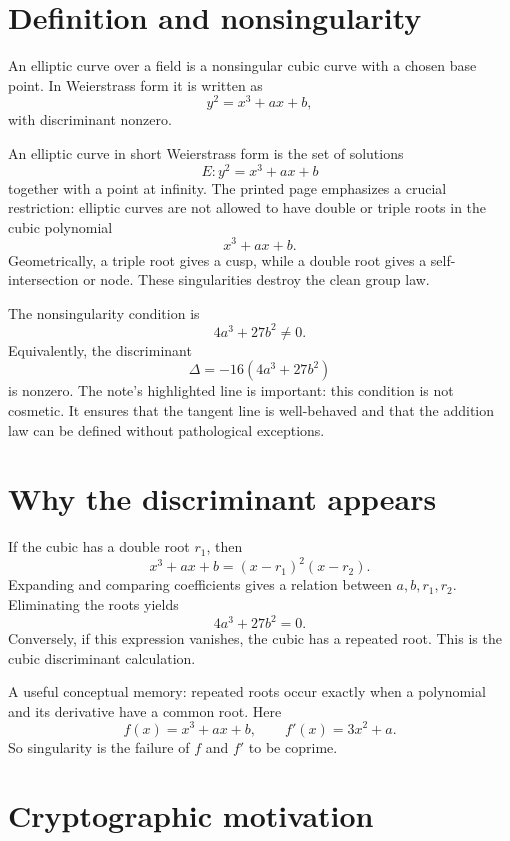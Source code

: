 
\section{Definition and nonsingularity}

\begin{definition}
An elliptic curve over a field is a nonsingular cubic curve with a chosen base point.  In Weierstrass form it is written as
\[
  y^2=x^3+ax+b,
\]
with discriminant nonzero.
\end{definition}


An elliptic curve in short Weierstrass form is the set of solutions
\[
  E:y^2=x^3+ax+b
\]
together with a point at infinity.  The printed page emphasizes a crucial restriction: elliptic curves are not allowed to have double or triple roots in the cubic polynomial
\[
  x^3+ax+b.
\]
Geometrically, a triple root gives a cusp, while a double root gives a self-intersection or node.  These singularities destroy the clean group law.

The nonsingularity condition is
\[
  4a^3+27b^2\neq0.
\]
Equivalently, the discriminant
\[
  \Delta=-16(4a^3+27b^2)
\]
is nonzero.  The note's highlighted line is important: this condition is not cosmetic.  It ensures that the tangent line is well-behaved and that the addition law can be defined without pathological exceptions.

\section{Why the discriminant appears}

If the cubic has a double root \(r_1\), then
\[
  x^3+ax+b=(x-r_1)^2(x-r_2).
\]
Expanding and comparing coefficients gives a relation between \(a,b,r_1,r_2\).  Eliminating the roots yields
\[
  4a^3+27b^2=0.
\]
Conversely, if this expression vanishes, the cubic has a repeated root.  This is the cubic discriminant calculation.

A useful conceptual memory: repeated roots occur exactly when a polynomial and its derivative have a common root.  Here
\[
  f(x)=x^3+ax+b,\qquad f'(x)=3x^2+a.
\]
So singularity is the failure of \(f\) and \(f'\) to be coprime.

\section{Cryptographic motivation}

